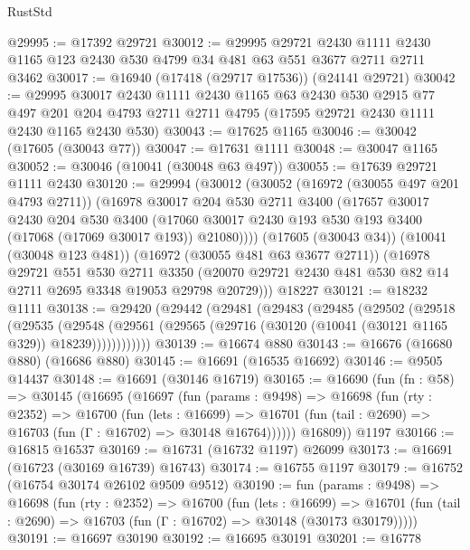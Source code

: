 \begin{lexlean}{RustStd}
\begin{coremodule}
@29995 := @17392 @29721
@30012 := @29995
    @29721
    @2430
    @1111
    @2430
    @1165
    @123
    @2430
    @530
    @4799
    @34
    @481
    @63
    @551
    @3677
    @2711
    @2711
    @3462
@30017 := @16940 (@17418 (@29717 @17536)) (@24141 @29721)
@30042 := @29995
    @30017
    @2430
    @1111
    @2430
    @1165
    @63
    @2430
    @530
    @2915
    @77
    @497
    @201
    @204
    @4793
    @2711
    @2711
    @4795
    (@17595 @29721 @2430 @1111 @2430 @1165 @2430 @530)
@30043 := @17625 @1165
@30046 := @30042 (@17605 (@30043 @77))
@30047 := @17631 @1111
@30048 := @30047 @1165
@30052 := @30046 (@10041 (@30048 @63 @497))
@30055 := @17639 @29721 @1111 @2430
@30120 := @29994
    (@30012
      (@30052
        (@16972 (@30055 @497 @201 @4793 @2711))
        (@16978
          @30017
          @204
          @530
          @2711
          @3400
          (@17657
            @30017
            @2430
            @204
            @530
            @3400
            (@17060 @30017 @2430 @193 @530 @193 @3400 (@17068 (@17069 @30017 @193)) @21080))))
      (@17605 (@30043 @34))
      (@10041 (@30048 @123 @481))
      (@16972 (@30055 @481 @63 @3677 @2711))
      (@16978
        @29721
        @551
        @530
        @2711
        @3350
        (@20070 @29721 @2430 @481 @530 @82 @14 @2711 @2695 @3348 @19053 @29798 @20729)))
    @18227
@30121 := @18232 @1111
@30138 := @29420
    (@29442
      (@29481
        (@29483
          (@29485
            (@29502
              (@29518
                (@29535
                  (@29548
                    (@29561 (@29565 (@29716 (@30120 (@10041 (@30121 @1165 @329)) @18239))))))))))))
@30139 := @16674 @880
@30143 := @16676 (@16680 @880) (@16686 @880)
@30145 := @16691 (@16535 @16692)
@30146 := @9505 @14437
@30148 := @16691 (@30146 @16719)
@30165 := @16690
    (fun (fn : @58) =>
    @30145
      (@16695
        (@16697
          (fun (params : @9498) =>
          @16698
            (fun (rty : @2352) =>
            @16700
              (fun (lets : @16699) =>
              @16701 (fun (tail : @2690) => @16703 (fun (Γ : @16702) => @30148 @16764))))))
        @16809))
    @1197
@30166 := @16815 @16537
@30169 := @16731 (@16732 @1197) @26099
@30173 := @16691 (@16723 (@30169 @16739) @16743)
@30174 := @16755 @1197
@30179 := @16752 (@16754 @30174 @26102 @9509 @9512)
@30190 := fun (params : @9498) =>
  @16698
    (fun (rty : @2352) =>
    @16700
      (fun (lets : @16699) =>
      @16701 (fun (tail : @2690) => @16703 (fun (Γ : @16702) => @30148 (@30173 @30179)))))
@30191 := @16697 @30190
@30192 := @16695 @30191
@30201 := @16778

\end{coremodule}
\end{lexlean}
